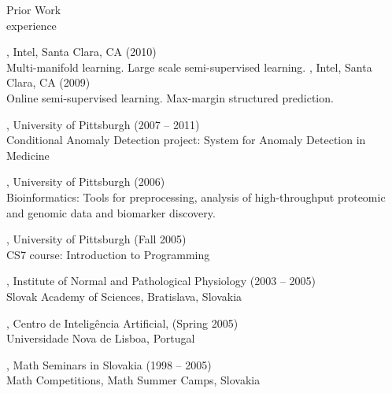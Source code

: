 \documentclass{resume}
\begin{document}


\begin{category}{Prior Work \\experience}

, Intel, Santa Clara, CA (2010) \\
Multi-manifold learning. Large scale semi-supervised learning.
, Intel, Santa Clara, CA (2009)\\
Online semi-supervised learning. Max-margin structured prediction.

, University of Pittsburgh (2007 -- 2011)\\
Conditional Anomaly Detection project: System for Anomaly Detection in Medicine

, University of Pittsburgh (2006)\\
Bioinformatics: Tools for preprocessing, analysis of high-throughput proteomic and genomic data and biomarker discovery.

, University of Pittsburgh (Fall 2005)\\ 
CS7 course: Introduction to Programming 

, Institute of Normal and Pathological Physiology (2003 -- 2005)\\
Slovak Academy of Sciences, Bratislava, Slovakia

, Centro de Intelig\^encia Artificial, (Spring 2005)\\
Universidade Nova de Lisboa, Portugal

, Math Seminars in Slovakia (1998 -- 2005)\\ 
Math Competitions, Math Summer Camps, Slovakia

%
%
\end{category}
\end{document}
